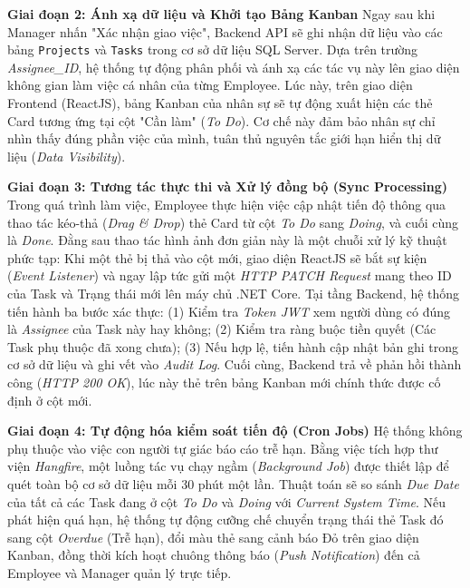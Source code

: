 \documentclass[a4paper,13.5pt]{extreport}
\begin{document}
\textbf{Giai đoạn 2: Ánh xạ dữ liệu và Khởi tạo Bảng Kanban}
Ngay sau khi Manager nhấn "Xác nhận giao việc", Backend API sẽ ghi nhận dữ liệu vào các bảng \texttt{Projects} và \texttt{Tasks} trong cơ sở dữ liệu SQL Server. Dựa trên trường \textit{Assignee\_ID}, hệ thống tự động phân phối và ánh xạ các tác vụ này lên giao diện không gian làm việc cá nhân của từng Employee.
Lúc này, trên giao diện Frontend (ReactJS), bảng Kanban của nhân sự sẽ tự động xuất hiện các thẻ Card tương ứng tại cột "Cần làm" (\textit{To Do}). Cơ chế này đảm bảo nhân sự chỉ nhìn thấy đúng phần việc của mình, tuân thủ nguyên tắc giới hạn hiển thị dữ liệu (\textit{Data Visibility}).

\textbf{Giai đoạn 3: Tương tác thực thi và Xử lý đồng bộ (Sync Processing)}
Trong quá trình làm việc, Employee thực hiện việc cập nhật tiến độ thông qua thao tác kéo-thả (\textit{Drag \& Drop}) thẻ Card từ cột \textit{To Do} sang \textit{Doing}, và cuối cùng là \textit{Done}. Đằng sau thao tác hình ảnh đơn giản này là một chuỗi xử lý kỹ thuật phức tạp:
Khi một thẻ bị thả vào cột mới, giao diện ReactJS sẽ bắt sự kiện (\textit{Event Listener}) và ngay lập tức gửi một \textit{HTTP PATCH Request} mang theo ID của Task và Trạng thái mới lên máy chủ .NET Core. Tại tầng Backend, hệ thống tiến hành ba bước xác thực: (1) Kiểm tra \textit{Token JWT} xem người dùng có đúng là \textit{Assignee} của Task này hay không; (2) Kiểm tra ràng buộc tiền quyết (Các Task phụ thuộc đã xong chưa); (3) Nếu hợp lệ, tiến hành cập nhật bản ghi trong cơ sở dữ liệu và ghi vết vào \textit{Audit Log}. Cuối cùng, Backend trả về phản hồi thành công (\textit{HTTP 200 OK}), lúc này thẻ trên bảng Kanban mới chính thức được cố định ở cột mới.

\textbf{Giai đoạn 4: Tự động hóa kiểm soát tiến độ (Cron Jobs)}
Hệ thống không phụ thuộc vào việc con người tự giác báo cáo trễ hạn. Bằng việc tích hợp thư viện \textit{Hangfire}, một luồng tác vụ chạy ngầm (\textit{Background Job}) được thiết lập để quét toàn bộ cơ sở dữ liệu mỗi 30 phút một lần. Thuật toán sẽ so sánh \textit{Due Date} của tất cả các Task đang ở cột \textit{To Do} và \textit{Doing} với \textit{Current System Time}. Nếu phát hiện quá hạn, hệ thống tự động cưỡng chế chuyển trạng thái thẻ Task đó sang cột \textit{Overdue} (Trễ hạn), đổi màu thẻ sang cảnh báo Đỏ trên giao diện Kanban, đồng thời kích hoạt chuông thông báo (\textit{Push Notification}) đến cả Employee và Manager quản lý trực tiếp. 
\end{document}
